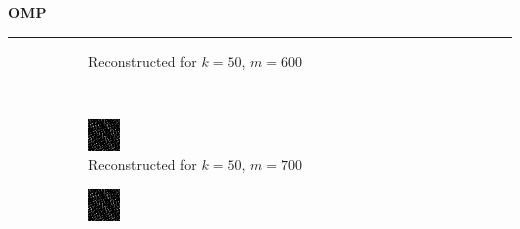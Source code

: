 \documentclass[a4paper,12pt]{article}
\newenvironment{solution}[2][]{%
    \begin{mdframed}[linecolor=blue!70!black, linewidth=2pt, roundcorner=10pt, backgroundcolor=yellow!10!white, skipabove=12pt, skipbelow=12pt]%
        \textbf{\large #2}
        \par\noindent\rule{\textwidth}{0.4pt}
}{
    \end{mdframed}
}
\begin{document}
\begin{solution}{OMP}
\begin{figure}[H]
\begin{subfigure}[t]{0.23\textwidth}
        \caption{Reconstructed for $k = 50$, $m = 600$}
    \end{subfigure}\\
    \begin{subfigure}[t]{0.23\textwidth}
        \centering
        \includegraphics[width=\textwidth]{../images/omp/Reconstructed_k_50_m_700.png}
        \caption{Reconstructed for $k = 50$, $m = 700$}
    \end{subfigure}
    \begin{subfigure}[t]{0.23\textwidth}
        \centering
        \includegraphics[width=\textwidth]{../images/omp/Reconstructed_k_50_m_800.png}

\end{subfigure}
\end{figure}
\end{solution}
\end{document}
